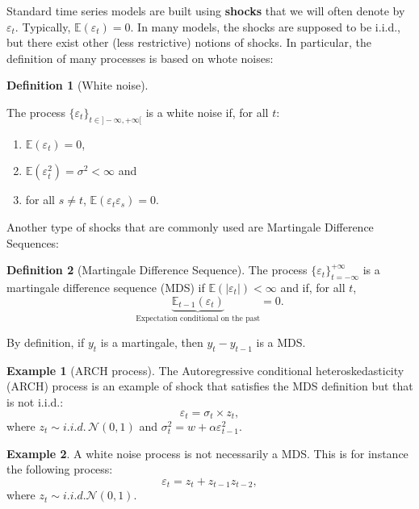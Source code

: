 \documentclass[
  12pt,
]{book}
\providecommand{\tightlist}{%
  \setlength{\itemsep}{0pt}\setlength{\parskip}{0pt}}
\theoremstyle{definition}
\newtheorem{definition}{Definition}[chapter]
\theoremstyle{definition}
\newtheorem{example}{Example}[chapter]
\theoremstyle{definition}
\theoremstyle{definition}
\theoremstyle{remark}
\begin{document}
Standard time series models are built using \textbf{shocks} that we will often denote by \(\varepsilon_t\). Typically, \(\mathbb{E}(\varepsilon_t)=0\). In many models, the shocks are supposed to be i.i.d., but there exist other (less restrictive) notions of shocks. In particular, the definition of many processes is based on whote noises:

\begin{definition}[White noise]
\protect\hypertarget{def:whitenoise}{}\label{def:whitenoise}

The process \(\{\varepsilon_t\}_{t \in] -\infty,+\infty[}\) is a white noise if, for all \(t\):

\begin{enumerate}
\def\labelenumi{\alph{enumi}.}
\tightlist
\item
  \(\mathbb{E}(\varepsilon_t)=0\),
\item
  \(\mathbb{E}(\varepsilon_t^2)=\sigma^2<\infty\) and
\item
  for all \(s\ne t\), \(\mathbb{E}(\varepsilon_t \varepsilon_s)=0\).
\end{enumerate}

\end{definition}

Another type of shocks that are commonly used are Martingale Difference Sequences:

\begin{definition}[Martingale Difference Sequence]
\protect\hypertarget{def:MDS}{}\label{def:MDS}The process \(\{\varepsilon_t\}_{t = -\infty}^{+\infty}\) is a martingale difference sequence (MDS) if \(\mathbb{E}(|\varepsilon_{t}|)<\infty\) and if, for all \(t\),
\[
\underbrace{\mathbb{E}_{t-1}(\varepsilon_{t})}_{\mbox{Expectation conditional on the past}}=0.
\]
\end{definition}

By definition, if \(y_t\) is a martingale, then \(y_{t}-y_{t-1}\) is a MDS.

\begin{example}[ARCH process]
\protect\hypertarget{exm:ARCH}{}\label{exm:ARCH}The Autoregressive conditional heteroskedasticity (ARCH) process is an example of shock that satisfies the MDS definition but that is not i.i.d.:
\[
\varepsilon_{t} = \sigma_t \times z_{t},
\]
where \(z_t \sim i.i.d.\,\mathcal{N}(0,1)\) and \(\sigma_t^2 = w + \alpha \varepsilon_{t-1}^2\).
\end{example}

\begin{example}
\protect\hypertarget{exm:whiteNotMDS}{}\label{exm:whiteNotMDS}A white noise process is not necessarily a MDS. This is for instance the following process:
\[
\varepsilon_{t} = z_t + z_{t-1}z_{t-2},
\]
where \(z_t \sim i.i.d.\mathcal{N}(0,1)\).
\end{example}
\end{document}
